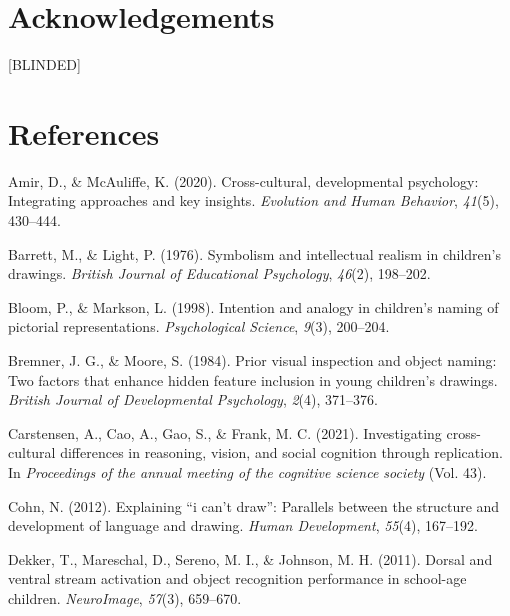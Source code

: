 \documentclass[
  english,
  man]{apa6}
\begin{document}
\hypertarget{acknowledgements}{%
\section{Acknowledgements}\label{acknowledgements}}

{[}BLINDED{]}

\newpage

\hypertarget{references}{%
\section{References}\label{references}}

\begingroup
\setlength{\parindent}{-0.5in}
\setlength{\leftskip}{0.5in}

\endgroup

\hypertarget{refs}{}
\leavevmode\hypertarget{ref-amir2020cross}{}%
Amir, D., \& McAuliffe, K. (2020). Cross-cultural, developmental psychology: Integrating approaches and key insights. \emph{Evolution and Human Behavior}, \emph{41}(5), 430--444.

\leavevmode\hypertarget{ref-barrett1976symbolism}{}%
Barrett, M., \& Light, P. (1976). Symbolism and intellectual realism in children's drawings. \emph{British Journal of Educational Psychology}, \emph{46}(2), 198--202.

\leavevmode\hypertarget{ref-bloom1998intention}{}%
Bloom, P., \& Markson, L. (1998). Intention and analogy in children's naming of pictorial representations. \emph{Psychological Science}, \emph{9}(3), 200--204.

\leavevmode\hypertarget{ref-bremmer1984prior}{}%
Bremner, J. G., \& Moore, S. (1984). Prior visual inspection and object naming: Two factors that enhance hidden feature inclusion in young children's drawings. \emph{British Journal of Developmental Psychology}, \emph{2}(4), 371--376.

\leavevmode\hypertarget{ref-carstensen2021investigating}{}%
Carstensen, A., Cao, A., Gao, S., \& Frank, M. C. (2021). Investigating cross-cultural differences in reasoning, vision, and social cognition through replication. In \emph{Proceedings of the annual meeting of the cognitive science society} (Vol. 43).

\leavevmode\hypertarget{ref-cohn2012explaining}{}%
Cohn, N. (2012). Explaining ``i can't draw'': Parallels between the structure and development of language and drawing. \emph{Human Development}, \emph{55}(4), 167--192.

\leavevmode\hypertarget{ref-dekker2011dorsal}{}%
Dekker, T., Mareschal, D., Sereno, M. I., \& Johnson, M. H. (2011). Dorsal and ventral stream activation and object recognition performance in school-age children. \emph{NeuroImage}, \emph{57}(3), 659--670.
\end{document}
